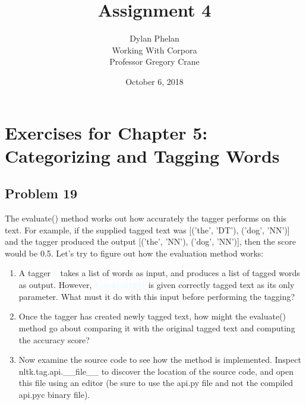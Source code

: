 \documentclass[11pt]{article}
\author{ 
	Dylan Phelan \\ 
	Working With Corpora \\ 
	Professor Gregory Crane 
}
\title{Assignment 4}
\date{October 6, 2018}
\newcommand{\codeword}[1]{
	\texttt{\textcolor{lightCyan}{#1}}
}
\begin{document}
\maketitle

\section*{Exercises for Chapter 5: Categorizing and Tagging Words}
\subsection*{Problem 19}

The evaluate() method works out how accurately the tagger performs on this text. For example, if the supplied tagged text was [('the', 'DT'), ('dog', 'NN')] and the tagger produced the output [('the', 'NN'), ('dog', 'NN')], then the score would be 0.5. Let's try to figure out how the evaluation method works:

\begin{enumerate}
	
	\item A tagger \codeword{t} takes a list of words as input, and produces a list of tagged words as output. However, \codeword{t.evaluate()} is given correctly tagged text as its only parameter. What must it do with this input before performing the tagging?
	
	\item Once the tagger has created newly tagged text, how might the evaluate() method go about comparing it with the original tagged text and computing the accuracy score?
	
	\item Now examine the source code to see how the method is implemented. Inspect nltk.tag.api.\_\_file\_\_ to discover the location of the source code, and open this file using an editor (be sure to use the api.py file and not the compiled api.pyc binary file).
	
\end{enumerate}
\end{document}
